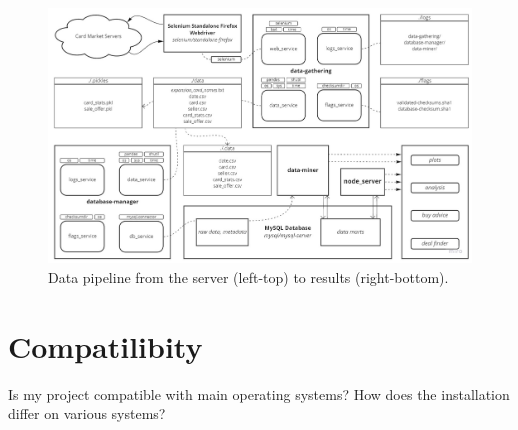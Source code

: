 \begin{figure}[ht]
\centering
\includegraphics[width=\textwidth]{figures/warehousing.jpg}
\caption{Data pipeline from the server (left-top) to results (right-bottom).}
\end{figure}


\section{Compatilibity}
Is my project compatible with main operating systems?
How does the installation differ on various systems?

